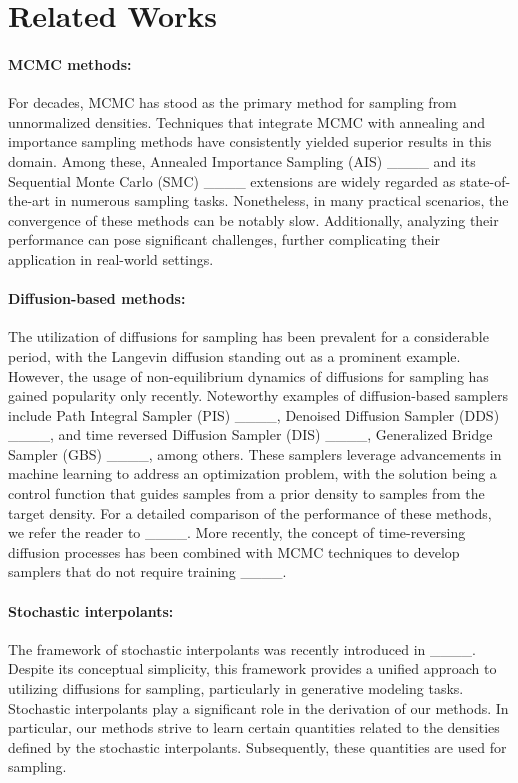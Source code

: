 \section{Related Works}
\paragraph{MCMC methods:} For decades, MCMC has stood as the primary method for sampling from unnormalized densities. Techniques that integrate MCMC with annealing and importance sampling methods have consistently yielded superior results in this domain. Among these, Annealed Importance Sampling (AIS) ____ and its Sequential Monte Carlo (SMC) ____ extensions are widely regarded as state-of-the-art in numerous sampling tasks. Nonetheless, in many practical scenarios, the convergence of these methods can be notably slow. Additionally, analyzing their performance can pose significant challenges, further complicating their application in real-world settings.
\paragraph{Diffusion-based methods:} 
The utilization of diffusions for sampling has been prevalent for a considerable period, with the Langevin diffusion standing out as a prominent example. However, the usage of non-equilibrium dynamics of diffusions for sampling has gained popularity only recently. Noteworthy examples of diffusion-based samplers include Path Integral Sampler (PIS) ____, Denoised Diffusion Sampler (DDS) ____, and time reversed Diffusion Sampler (DIS) ____, Generalized Bridge Sampler (GBS) ____, among others. These samplers leverage advancements in machine learning to address an optimization problem, with the solution being a control function that guides samples from a prior density to samples from the target density. For a detailed comparison of the performance of these methods, we refer the reader to ____. More recently, the concept of time-reversing diffusion processes has been combined with MCMC techniques to develop samplers that do not require training ____.
\paragraph{Stochastic interpolants:} 
The framework of stochastic interpolants was recently introduced in ____. Despite its conceptual simplicity, this framework provides a unified approach to utilizing diffusions for sampling, particularly in generative modeling tasks. Stochastic interpolants play a significant role in the derivation of our methods. In particular, our methods strive to learn certain quantities related to the densities defined by the stochastic interpolants. Subsequently, these quantities are used for sampling.
